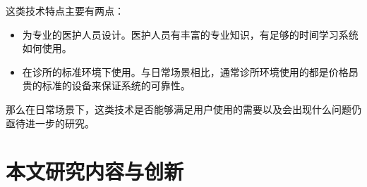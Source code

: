 

这类技术特点主要有两点：
\begin{itemize}
    \item 为专业的医护人员设计。医护人员有丰富的专业知识，有足够的时间学习系统如何使用。
    
    \item 在诊所的标准环境下使用。与日常场景相比，通常诊所环境使用的都是价格昂贵的标准的设备来保证系统的可靠性。

\end{itemize}

那么在日常场景下，这类技术是否能够满足用户使用的需要以及会出现什么问题仍亟待进一步的研究。





\section{本文研究内容与创新}

